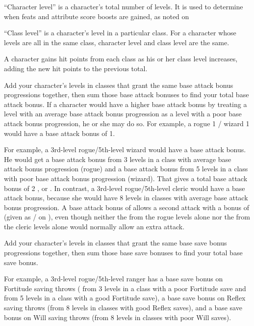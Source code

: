  ``Character level'' is a character's total number of levels. It is used to determine when feats and attribute score boosts are gained, as noted on 

\par ``Class level'' is a character's level in a particular class. For a character whose levels are all in the same class, character level and class level are the same.

 A character gains hit points from each class as his or her class level increases, adding the new hit points to the previous total.

 Add your character's levels in classes that grant the same base attack bonus progressions together, then sum those base attack bonuses to find your total base attack bonus. If a character would have a higher base attack bonus by treating a level with an average base attack bonus progression as a level with a poor base attack bonus progression, he or she may do so. For example, a rogue 1 / wizard 1 would have a base attack bonus of 1.

\par For example, a 3rd-level rogue/5th-level wizard would have a  base attack bonus. He would get a  base attack bonus from 3 levels in a class with average base attack bonus progression (rogue) and a  base attack bonus from 5 levels in a class with poor base attack bonus progression (wizard). That gives a total base attack bonus of 2 , or . In contrast, a 3rd-level rogue/5th-level cleric would have a  base attack bonus, because she would have 8 levels in classes with average base attack bonus progression. A base attack bonus of  allows a second attack with a bonus of  (given as / on ), even though neither the  from the rogue levels alone nor the  from the cleric levels alone would normally allow an extra attack.

 Add your character's levels in classes that grant the same base save bonus progressions together, then sum those base save bonuses to find your total base save bonus.

\par For example, a 3rd-level rogue/5th-level ranger has a  base save bonus on Fortitude saving throws ( from 3 levels in a class with a poor Fortitude save and  from 5 levels in a class with a good Fortitude save), a  base save bonus on Reflex saving throws (from 8 levels in classes with good Reflex saves), and a  base save bonus on Will saving throws (from 8 levels in classes with poor Will saves).

